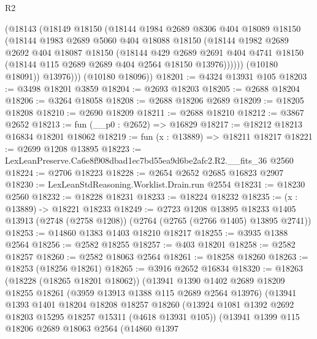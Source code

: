 \begin{lexlean}{R2}
\begin{coremodule}
            (@18143
              (@18149
                @18150
                (@18144
                  @1984
                  @2689
                  @8306
                  @404
                  @18089
                  @18150
                  (@18144
                    @1983
                    @2689
                    @5060
                    @404
                    @18088
                    @18150
                    (@18144
                      @1982
                      @2689
                      @2692
                      @404
                      @18087
                      @18150
                      (@18144
                        @429
                        @2689
                        @2691
                        @404
                        @4741
                        @18150
                        (@18144 @115 @2689 @2689 @404 @2564 @18150 @13976))))))
              (@10180 @18091))
            @13976)))
      (@10180 @18096))
@18201 := @4324 @13931 @105
@18203 := @3498 @18201 @3859
@18204 := @2693 @18203
@18205 := @2688 @18204
@18206 := @3264 @18058
@18208 := @2688 @18206 @2689
@18209 := @18205 @18208
@18210 := @2690 @18209
@18211 := @2688 @18210
@18212 := @3867 @2652
@18213 := fun (__p0 : @2652) => @16829
@18217 := @18212 @18213 @16834 @18201 @18062
@18219 := fun (x : @13889) => @18211 @18217
@18221 := @2699 @1208 @13895
@18223 := LexLeanPreserve.Ca6e8f908dbad1ec7bd55ea9d6be2afc2.R2.__fits_36 @2560
@18224 := @2706 @18223
@18228 := @2654 @2652 @2685 @16823 @2907
@18230 := LexLeanStdReasoning.Worklist.Drain.run @2554
@18231 := @18230 @2560
@18232 := @18228 @18231
@18233 := @18224 @18232
@18235 := (x : @13889) -> @18221 @18233
@18249 := @2723
    @1208
    @13895
    @18233
    @1405
    @13913
    (@2748 (@2758 @1208))
    (@2764 (@2765 (@2766 @1405) @13895 @2741))
@18253 := @14860 @1383 @1403 @18210 @18217
@18255 := @3935 @1388 @2564
@18256 := @2582 @18255
@18257 := @403 @18201
@18258 := @2582 @18257
@18260 := @2582 @18063 @2564
@18261 := @18258 @18260
@18263 := @18253 (@18256 @18261)
@18265 := @3916 @2652 @16834
@18320 := @18263
    (@18228 (@18265 @18201 @18062))
    (@13941
      @1390
      @1402
      @2689
      @18209
      @18255
      @18261
      (@3959 @13913 @1388 @115 @2689 @2564 @13976)
      (@13941
        @1393
        @1401
        @18204
        @18208
        @18257
        @18260
        (@13924 @1081 @1392 @2692 @18203 @15295 @18257 @15311 (@4618 @13931 @105))
        (@13941
          @1399
          @115
          @18206
          @2689
          @18063
          @2564
          (@14860
            @1397

\end{coremodule}
\end{lexlean}
